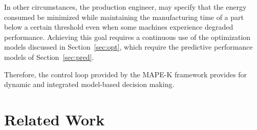 \documentclass[a4paper, 12pt]{article} %
\begin{document}
In other circumstances, the production engineer, may specify that the energy consumed be minimized  while maintaining the manufacturing time of a part below a certain threshold even when some machines experience degraded performance. Achieving this goal requires a continuous use of  the optimization models discussed in Section~\ref{sec:opt}, which require the predictive performance models of Section~\ref{sec:pred}.

Therefore, the control loop provided by the MAPE-K framework provides for dynamic and integrated model-based decision making.



\section{Related Work} \label {sec:relwork}
\end{document}
